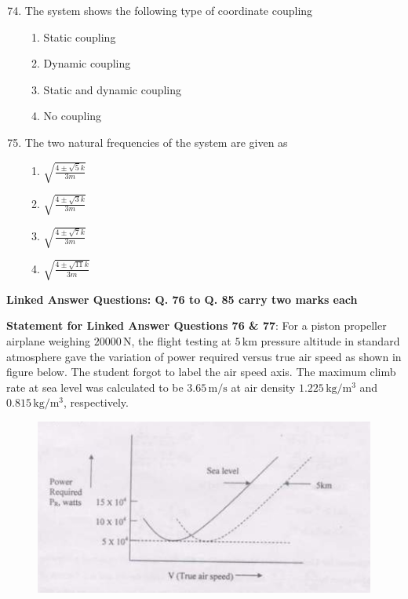 \documentclass{article}
\begin{document}
\begin{enumerate}
    \setcounter{enumi}{73}
    \item The system shows the following type of coordinate coupling
    \begin{enumerate}
        \item Static coupling
        \item Dynamic coupling
        \item Static and dynamic coupling
        \item No coupling
    \end{enumerate}

    \item The two natural frequencies of the system are given as
    \begin{multicols}{2}
    \begin{enumerate}
        \item $\sqrt{\frac{4 \pm \sqrt{5} k}{3 m}}$
        \item $\sqrt{\frac{4 \pm \sqrt{3} k}{3 m}}$
        \item $\sqrt{\frac{4 \pm \sqrt{7} k}{3 m}}$
        \item $\sqrt{\frac{4 \pm \sqrt{11} k}{3 m}}$
    \end{enumerate}
    \end{multicols}
    
\end{enumerate}

\begin{center}
    \textbf{Linked Answer Questions: Q. 76 to Q. 85 carry two marks each}
\end{center}


\textbf{Statement for Linked Answer Questions 76 \& 77}: For a piston propeller airplane weighing $20000 \, \mathrm{N}$, the flight testing at $5 \, \mathrm{km}$ pressure altitude in standard atmosphere gave the variation of power required versus true air speed as shown in figure below. The student forgot to label the air speed axis. The maximum climb rate at sea level was calculated to be $3.65 \, \mathrm{m/s}$ at air density $1.225 \, \mathrm{kg/m^3}$ and $0.815 \, \mathrm{kg/m^3}$, respectively.

\begin{figure}[H]
    \centering
    \includegraphics[width=0.5\linewidth]{figs/q76 77.png}
    \caption{}
    \label{}
\end{figure}
\end{document}
